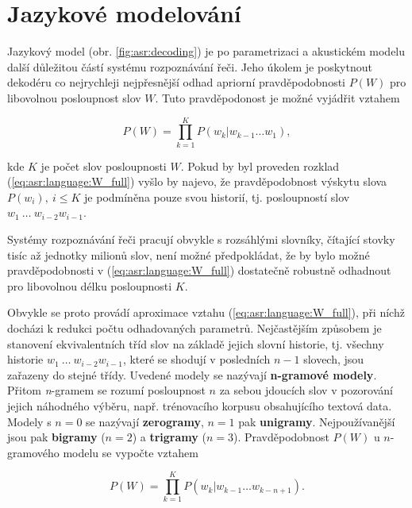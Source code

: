 \section{Jazykové modelování}
\label{chap:asr:language}

Jazykový model (obr. \ref{fig:asr:decoding}) je po parametrizaci a akustickém modelu další důležitou částí systému rozpoznávání řeči. Jeho úkolem je poskytnout dekodéru co nejrychleji nejpřesnější odhad apriorní pravděpodobnosti $P\left(W\right)$ pro libovolnou posloupnost slov $W$. Tuto pravděpodonost je možné vyjádřit vztahem

\begin{equation}
  P\left(W\right) = \prod_{k=1}^{K} P\left(w_k | w_{k-1}\dots w_{1}\right),
  \label{eq:asr:language:W_full}
\end{equation}

\noindent kde $K$ je počet slov posloupnosti $W$. Pokud by byl proveden rozklad (\ref{eq:asr:language:W_full}) vyšlo by najevo, že pravděpodobnost výskytu slova $P\left(w_i\right),\ i \leq K$ je podmíněna pouze svou historií, tj. posloupností slov $w_1\ \dots\ w_{i-2}w_{i-1}$.

Systémy rozpoznávání řeči pracují obvykle s rozsáhlými slovníky, čítající stovky tisíc až jednotky milionů slov, není možné předpokládat, že by bylo možné pravděpodobnosti v (\ref{eq:asr:language:W_full}) dostatečně robustně odhadnout pro libovolnou délku posloupnosti $K$.

Obvykle se proto provádí aproximace vztahu (\ref{eq:asr:language:W_full}), při níchž docházi k redukci počtu odhadovaných parametrů. Nejčastějším způsobem je stanovení ekvivalentních tříd slov na základě jejich slovní historie, tj. všechny historie $w_1\ \dots\ w_{i-2}w_{i-1}$, které se shodují v posledních $n-1$ slovech, jsou zařazeny do stejné třídy. Uvedené modely se nazývají \textbf{n-gramové modely}. Přitom \textit{n}-gramem se rozumí posloupnost $n$ za sebou jdoucích slov v pozorování jejich náhodného výběru, např. trénovacího korpusu obsahujícího textová data. Modely s $n=0$ se nazývají \textbf{zerogramy}, $n=1$ pak \textbf{unigramy}. Nejpoužívanější jsou pak \textbf{bigramy} ($n=2$) a \textbf{trigramy} ($n=3$). Pravděpodobnost $P\left(W\right)$ u $n$-gramového modelu se vypočte vztahem

\begin{equation}
  P\left(W\right) = \prod_{k=1}^{K} P\left(w_k | w_{k-1}\dots w_{k-n+1}\right).
  \label{eq:asr:language:W}
\end{equation}

